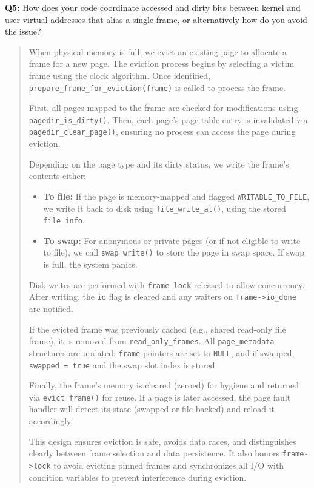 \documentclass[a4paper,11pt]{paper}
\begin{document}
\textbf{Q5:} How does your code coordinate accessed and dirty bits between kernel and user virtual addresses that alias a single frame, or alternatively how do you avoid the issue?
\begin{quote}
 When physical memory is full, we evict an existing page to allocate a frame for a new page. The eviction process begins by selecting a victim frame using the clock algorithm. Once identified, \texttt{prepare\_frame\_for\_eviction(frame)} is called to process the frame.

First, all pages mapped to the frame are checked for modifications using \texttt{pagedir\_is\_dirty()}. Then, each page's page table entry is invalidated via \texttt{pagedir\_clear\_page()}, ensuring no process can access the page during eviction.

Depending on the page type and its dirty status, we write the frame’s contents either:
\begin{itemize}
    \item \textbf{To file:} If the page is memory-mapped and flagged \texttt{WRITABLE\_TO\_FILE}, we write it back to disk using \texttt{file\_write\_at()}, using the stored \texttt{file\_info}.
    \item \textbf{To swap:} For anonymous or private pages (or if not eligible to write to file), we call \texttt{swap\_write()} to store the page in swap space. If swap is full, the system panics.
\end{itemize}

Disk writes are performed with \texttt{frame\_lock} released to allow concurrency. After writing, the \texttt{io} flag is cleared and any waiters on \texttt{frame->io\_done} are notified.

If the evicted frame was previously cached (e.g., shared read-only file frame), it is removed from \texttt{read\_only\_frames}. All \texttt{page\_metadata} structures are updated: \texttt{frame} pointers are set to \texttt{NULL}, and if swapped, \texttt{swapped = true} and the swap slot index is stored.

Finally, the frame’s memory is cleared (zeroed) for hygiene and returned via \texttt{evict\_frame()} for reuse. If a page is later accessed, the page fault handler will detect its state (swapped or file-backed) and reload it accordingly.

This design ensures eviction is safe, avoids data races, and distinguishes clearly between frame selection and data persistence. It also honors \texttt{frame->lock} to avoid evicting pinned frames and synchronizes all I/O with condition variables to prevent interference during eviction.

\end{quote}
\end{document}
